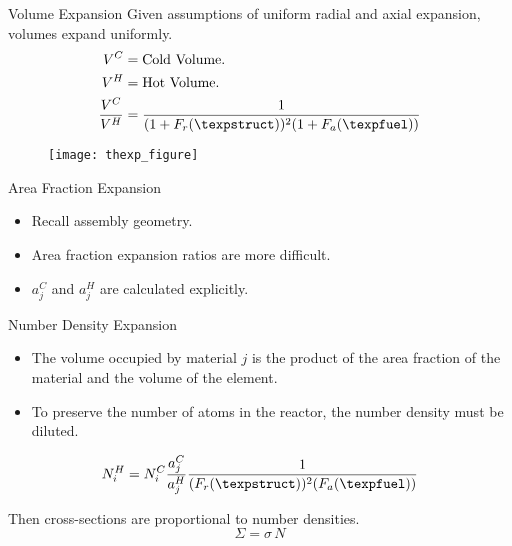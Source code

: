\begin{frame}{Volume Expansion}
  Given assumptions of uniform radial and axial expansion, volumes expand
  uniformly.
  \begin{align}
    \label{eq:volume_ratio}
    V^C &= \text{Cold Volume.}\\
    V^H &= \text{Hot Volume.}\\
    \frac{V^C}{V^H} &= \frac{1}{(1+F_r(\texpstruct))^2 (1+F_a(\texpfuel))}
  \end{align}

  \begin{figure}
    \centering
    \texttt{[image: thexp\_figure]}
    \label{fig:thexp_figure}
  \end{figure}
\end{frame}

\begin{frame}{Area Fraction Expansion}
  \begin{itemize}
    \item Recall assembly geometry.
    \item Area fraction expansion ratios are more difficult.
    \item $a_j^C$ and $a_j^H$ are calculated explicitly.
  \end{itemize}

  \begin{figure}
    \centering
    \hspace{0.2in}
    \label{fig:assy_geometry}
  \end{figure}
\end{frame}

\begin{frame}{Number Density Expansion}
  \begin{itemize}
    \item The volume occupied by material $j$ is the product of the 
      area fraction of the material and the volume of the element.
    \item To preserve the number of atoms in the reactor, the number density 
      must be diluted.
  \end{itemize}
  \begin{equation}
    \label{eq:nden_thexp_update}
    N_i^H = N_i^C \frac{a_j^C}{a_j^H} 
      \frac{1}{(F_r(\texpstruct))^2 (F_a(\texpfuel))}
  \end{equation}

  Then cross-sections are proportional to number densities.
  \begin{equation}
    \Sigma = \sigma \, N
  \end{equation}
\end{frame}

